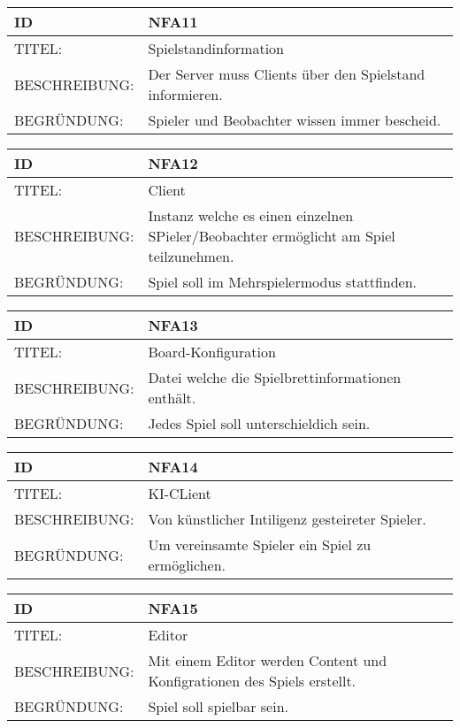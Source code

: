 \documentclass{uulm-assignment}
\begin{document}
    \begin{tabularx}{\textwidth}{|l|X |} \hline
        \textbf{ID} & \textbf{NFA11} \\
        \hline
        TITEL: &  Spielstandinformation\\
        \hline
        BESCHREIBUNG: &  Der Server muss Clients über den Spielstand informieren.\\
        \hline
        BEGRÜNDUNG: &  Spieler und Beobachter wissen immer bescheid.\\
        \hline
    \end{tabularx}

    \begin{tabularx}{\textwidth}{|l|X |} \hline
        \textbf{ID} & \textbf{NFA12} \\
        \hline
        TITEL: &  Client\\
        \hline
        BESCHREIBUNG: &  Instanz welche es einen einzelnen SPieler/Beobachter ermöglicht am Spiel teilzunehmen.\\
        \hline
        BEGRÜNDUNG: &  Spiel soll im Mehrspielermodus stattfinden.\\
        \hline
    \end{tabularx}

    \begin{tabularx}{\textwidth}{|l|X |} \hline
        \textbf{ID} & \textbf{NFA13} \\
        \hline
        TITEL: &  Board-Konfiguration\\
        \hline
        BESCHREIBUNG: &  Datei welche die Spielbrettinformationen enthält.\\
        \hline
        BEGRÜNDUNG: &  Jedes Spiel soll unterschieldich sein.\\
        \hline
    \end{tabularx}

    \begin{tabularx}{\textwidth}{|l|X |} \hline
        \textbf{ID} & \textbf{NFA14} \\
        \hline
        TITEL: &  KI-CLient\\
        \hline
        BESCHREIBUNG: &  Von künstlicher Intiligenz gesteireter Spieler.\\
        \hline
        BEGRÜNDUNG: &  Um vereinsamte Spieler ein Spiel zu ermöglichen.\\
        \hline
    \end{tabularx}

    \begin{tabularx}{\textwidth}{|l|X |} \hline
        \textbf{ID} & \textbf{NFA15} \\
        \hline
        TITEL: &  Editor\\
        \hline
        BESCHREIBUNG: &  Mit einem Editor werden Content und Konfigrationen des Spiels erstellt.\\
        \hline
        BEGRÜNDUNG: &  Spiel soll spielbar sein.\\
        \hline
    \end{tabularx}
    
\end{document}
